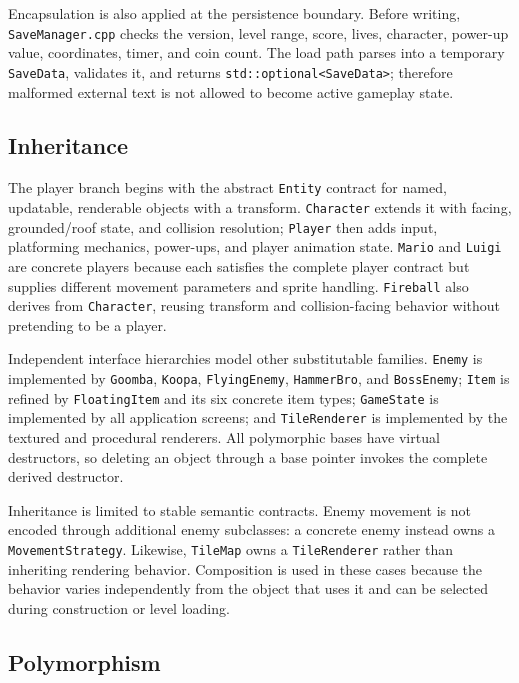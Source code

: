 \documentclass{template}
\begin{document}
Encapsulation is also applied at the persistence boundary. Before writing,
\texttt{SaveManager.cpp} checks the version, level range, score, lives,
character, power-up value, coordinates, timer, and coin count. The load path
parses into a temporary \texttt{SaveData}, validates it, and returns
\texttt{std::optional<SaveData>}; therefore malformed external text is not
allowed to become active gameplay state.

\subsection{Inheritance}

The player branch begins with the abstract \texttt{Entity} contract for named,
updatable, renderable objects with a transform. \texttt{Character} extends it
with facing, grounded/roof state, and collision resolution;
\texttt{Player} then adds input, platforming mechanics, power-ups, and player
animation state. \texttt{Mario} and \texttt{Luigi} are concrete players because
each satisfies the complete player contract but supplies different movement
parameters and sprite handling. \texttt{Fireball} also derives from
\texttt{Character}, reusing transform and collision-facing behavior without
pretending to be a player.

Independent interface hierarchies model other substitutable families.
\texttt{Enemy} is implemented by \texttt{Goomba}, \texttt{Koopa},
\texttt{FlyingEnemy}, \texttt{HammerBro}, and \texttt{BossEnemy};
\texttt{Item} is refined by \texttt{FloatingItem} and its six concrete item
types; \texttt{GameState} is implemented by all application screens; and
\texttt{TileRenderer} is implemented by the textured and procedural renderers.
All polymorphic bases have virtual destructors, so deleting an object through
a base pointer invokes the complete derived destructor.

Inheritance is limited to stable semantic contracts. Enemy movement is not
encoded through additional enemy subclasses: a concrete enemy instead owns a
\texttt{MovementStrategy}. Likewise, \texttt{TileMap} owns a
\texttt{TileRenderer} rather than inheriting rendering behavior. Composition is
used in these cases because the behavior varies independently from the object
that uses it and can be selected during construction or level loading.

\subsection{Polymorphism}
\end{document}
